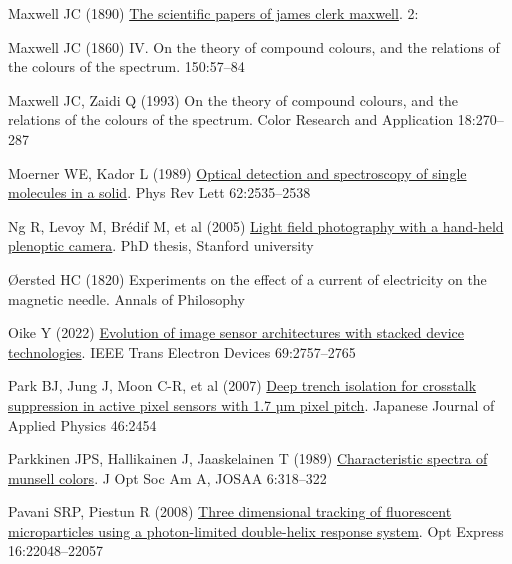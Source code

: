 \documentclass[
  letterpaper,
]{book}
\newlength{\cslhangindent}
\newenvironment{CSLReferences}[2] %
 {\begin{list}{}{%
  \setlength{\itemindent}{0pt}
  \setlength{\leftmargin}{0pt}
  \setlength{\parsep}{0pt}
  \ifodd #1
   \setlength{\leftmargin}{\cslhangindent}
   \setlength{\itemindent}{-1\cslhangindent}
  \fi
  \setlength{\itemsep}{#2\baselineskip}}}
 {\end{list}}
\begin{document}
\begin{CSLReferences}{1}{1}
Maxwell JC (1890)
\href{https://books.google.com/books?hl=en&lr=&id=LrI-AQAAMAAJ&oi=fnd&pg=PP12&dq=The+scientific+papers+of+james+clerk+maxwell&ots=MCxHuT5v8p&sig=BFG00TQBjNufpeEDQFNs6JXUXn4}{The
scientific papers of james clerk maxwell}. 2:

Maxwell JC (1860) {IV}. {On} the theory of compound colours, and the
relations of the colours of the spectrum. 150:57--84

Maxwell JC, Zaidi Q (1993) On the theory of compound colours, and the
relations of the colours of the spectrum. Color Research and Application
18:270--287

Moerner WE, Kador L (1989)
\href{http://dx.doi.org/10.1103/physrevlett.62.2535}{Optical detection
and spectroscopy of single molecules in a solid}. Phys Rev Lett
62:2535--2538

Ng R, Levoy M, Brédif M, et al (2005)
\href{'https://hal.science/hal-02551481'}{Light field photography with a
hand-held plenoptic camera}. PhD thesis, Stanford university

Øersted HC (1820) Experiments on the effect of a current of electricity
on the magnetic needle. Annals of Philosophy

Oike Y (2022)
\href{https://ieeexplore.ieee.org/abstract/document/9494712/}{Evolution
of image sensor architectures with stacked device technologies}. IEEE
Trans Electron Devices 69:2757--2765

Park BJ, Jung J, Moon C-R, et al (2007)
\href{http://dx.doi.org/10.1143/jjap.46.2454/meta}{Deep trench isolation
for crosstalk suppression in active pixel sensors with 1.7 µm pixel
pitch}. Japanese Journal of Applied Physics 46:2454

Parkkinen JPS, Hallikainen J, Jaaskelainen T (1989)
\href{https://opg.optica.org/abstract.cfm?uri=josaa-6-2-318}{Characteristic
spectra of munsell colors}. J Opt Soc Am A, JOSAA 6:318--322

Pavani SRP, Piestun R (2008)
\href{http://dx.doi.org/10.1364/OE.16.022048}{Three dimensional tracking
of fluorescent microparticles using a photon-limited double-helix
response system}. Opt Express 16:22048--22057


\end{CSLReferences}
\end{document}
